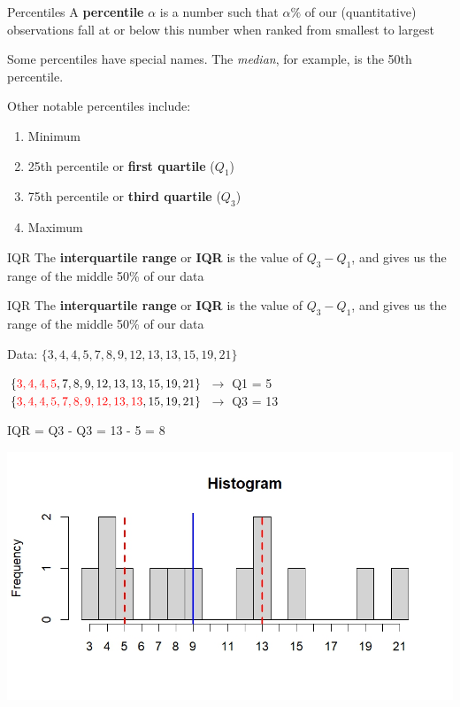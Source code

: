 \documentclass{beamer}
\begin{document}
\begin{frame}{Percentiles}
A \textbf{percentile} $\alpha$ is a number such that $\alpha\%$ of our (quantitative) observations fall at or below this number when ranked from smallest to largest \vspace{5mm}

Some percentiles have special names. The \textit{median}, for example, is the 50th percentile. \vspace{5mm}

Other notable percentiles include:
\begin{enumerate}
\item Minimum
\item 25th percentile or \textbf{first quartile} ($Q_1$)
\item 75th percentile or \textbf{third quartile} ($Q_3$)
\item Maximum
\end{enumerate}
\vspace{3mm}
\end{frame}

\begin{frame}{IQR}
The \textbf{interquartile range} or \textbf{IQR} is the value of $Q_3 - Q_1$, and gives us the range of the middle 50\% of our data \vspace{3mm}
\end{frame}

\begin{frame}{IQR}
The \textbf{interquartile range} or \textbf{IQR} is the value of $Q_3 - Q_1$, and gives us the range of the middle 50\% of our data \vspace{5mm}

Data: \hspace{2mm} $\{3, 4, 4, 5, 7, 8, 9, 12, 13, 13, 15, 19, 21\}$ \vspace{3mm}

$\{{\color{red}3, 4, 4, 5}, 7, 8, 9, 12, 13, 13, 15, 19, 21\}$ $\rightarrow$ Q1 = 5
$\{{\color{red}3, 4, 4, 5, 7, 8, 9, 12, 13, 13}, 15, 19, 21\}$ $\rightarrow$ Q3 = 13

IQR = Q3 - Q3 = 13 - 5 = 8
\begin{center}
\includegraphics[scale=0.45]{img/IQR_hist.jpeg}
\end{center}
\end{frame}
\end{document}
